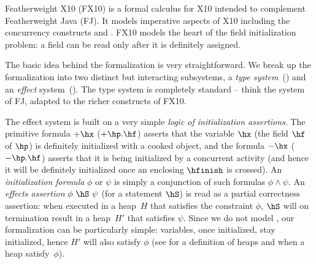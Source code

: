 Featherweight X10 (FX10) is a formal calculus for X10 intended to  complement Featherweight Java
(FJ).  It models imperative aspects of X10 including the concurrency
constructs \hfinish{} and \hasync{}.
FX10 models the heart of the field initialization problem:
    a field can be read only after it  is definitely assigned.


The basic idea behind the formalization is very straightforward. We
break up the formalization into two distinct but interacting
subsystems, a {\em type system}~() and an {\em
  effect} system~(). The type
system is completely standard -- think the system of FJ, adapted to
the richer constructs of FX10.

The effect system is built on a very simple {\em logic of
  initialization assertions}.  The primitive formula $+\hx$
($+\hp.\hf$) asserts that the variable $\hx$ (the field $\hf$ of
$\hp$) is definitely initialized with a cooked object, and the formula $-\hx$
($-\hp.\hf$) asserts that it is being initialized by a concurrent
activity (and hence it will be definitely initialized once an
enclosing $\hfinish$ is crossed).
An {\em initialization formula}
$\phi$ or $\psi$ is simply a conjunction of such formulas $\phi \wedge
\psi$. %
An {\em
  effects assertion} $\phi~\hS~\psi$ (for a statement $\hS$) is read as a
partial correctness assertion: when executed in a heap~$H$ that satisfies
the constraint $\phi$, $\hS$ will on termination result in a heap~$H'$ that
satisfies $\psi$.  Since we do not model , our
formalization can be particularly simple: variables, once initialized,
stay initialized, hence $H'$ will also satisfy $\phi$
    (see  for a definition of heaps and when a heap satisfy~$\phi$).

